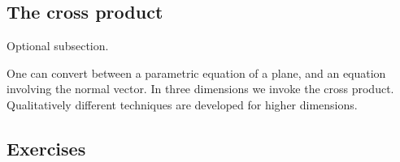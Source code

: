 \begin{draft}
\section{The cross product}
\label{sec:cp}
\secttoc

\begin{aside}
Optional subsection.
\end{aside}

\begin{comment}
Omit this section in a first draft.
Area of parallelogram. 
Geometric and algebraic definition of cross product.
Formula as a \(3\times 3\) determinant (although not used again until \S\ref{sec:feebh}, and not defined in general until Chap~\ref{ch:ddm}).
Properties.
Normal of plane and equations.
Area of parallelogram and volume of parallelepiped. 
\end{comment}


One can convert between a parametric equation of a plane, and an equation involving the normal vector.
In three dimensions we invoke the cross product.
Qualitatively different techniques are developed for higher dimensions.





\subsection{Exercises}




\end{draft}



